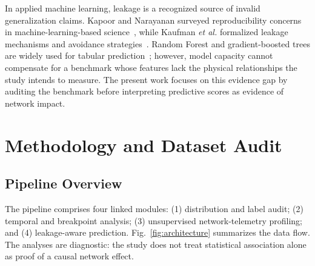 \documentclass[conference]{IEEEtran}
\begin{document}
In applied machine learning, leakage is a recognized source of invalid generalization claims. Kapoor and Narayanan surveyed reproducibility concerns in machine-learning-based science~\cite{kapoor2023leakage}, while Kaufman \textit{et al.} formalized leakage mechanisms and avoidance strategies~\cite{kaufman2012leakage}. Random Forest and gradient-boosted trees are widely used for tabular prediction~\cite{breiman2001random, ke2017lightgbm, chen2016xgboost}; however, model capacity cannot compensate for a benchmark whose features lack the physical relationships the study intends to measure. The present work focuses on this evidence gap by auditing the benchmark before interpreting predictive scores as evidence of network impact.

\section{Methodology and Dataset Audit}
\label{sec:methodology}

\subsection{Pipeline Overview}
The pipeline comprises four linked modules: (1) distribution and label audit; (2) temporal and breakpoint analysis; (3) unsupervised network-telemetry profiling; and (4) leakage-aware prediction. Fig.~\ref{fig:architecture} summarizes the data flow. The analyses are diagnostic: the study does not treat statistical association alone as proof of a causal network effect.
\end{document}
